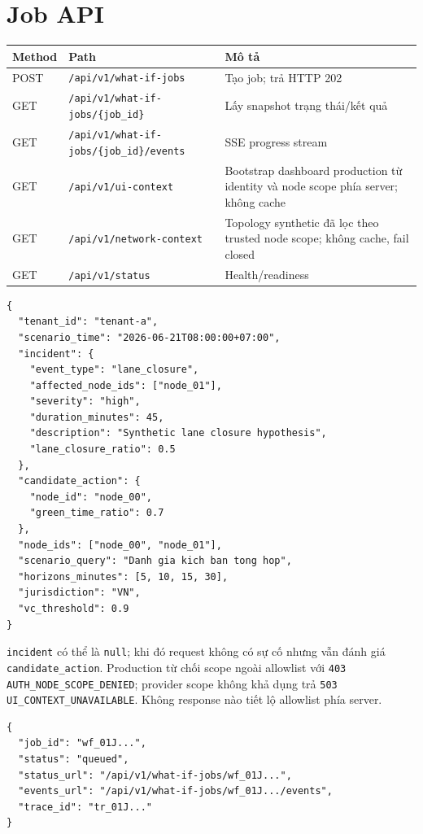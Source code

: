 \section{Job API}

\begin{longtable}{p{2cm} p{6cm} p{6cm}}
\toprule
\textbf{Method} & \textbf{Path} & \textbf{Mô tả} \\
\midrule
POST & \texttt{/api/v1/what-if-jobs} & Tạo job; trả HTTP 202 \\
GET & \texttt{/api/v1/what-if-jobs/}\newline\texttt{\{job\_id\}} & Lấy snapshot trạng thái/kết quả \\
GET & \texttt{/api/v1/what-if-jobs/}\newline\texttt{\{job\_id\}/events} & SSE progress stream \\
GET & \texttt{/api/v1/ui-context} & Bootstrap dashboard production từ identity và node scope phía server; không cache \\
GET & \texttt{/api/v1/network-context} & Topology synthetic đã lọc theo trusted node scope; không cache, fail closed \\
GET & \texttt{/api/v1/status} & Health/readiness \\
\bottomrule
\end{longtable}

\begin{lstlisting}[caption={Create-job request có incident tùy chọn},label={lst:api_create_request}]
{
  "tenant_id": "tenant-a",
  "scenario_time": "2026-06-21T08:00:00+07:00",
  "incident": {
    "event_type": "lane_closure",
    "affected_node_ids": ["node_01"],
    "severity": "high",
    "duration_minutes": 45,
    "description": "Synthetic lane closure hypothesis",
    "lane_closure_ratio": 0.5
  },
  "candidate_action": {
    "node_id": "node_00",
    "green_time_ratio": 0.7
  },
  "node_ids": ["node_00", "node_01"],
  "scenario_query": "Danh gia kich ban tong hop",
  "horizons_minutes": [5, 10, 15, 30],
  "jurisdiction": "VN",
  "vc_threshold": 0.9
}
\end{lstlisting}

\texttt{incident} có thể là \texttt{null}; khi đó request không có sự cố nhưng
vẫn đánh giá \texttt{candidate\_action}. Production từ chối scope ngoài
allowlist với \texttt{403} \nolinkurl{AUTH_NODE_SCOPE_DENIED}; provider scope không khả
dụng trả \texttt{503} \nolinkurl{UI_CONTEXT_UNAVAILABLE}. Không response nào tiết lộ
allowlist phía server.

\begin{lstlisting}[caption={Create-job response},label={lst:api_create}]
{
  "job_id": "wf_01J...",
  "status": "queued",
  "status_url": "/api/v1/what-if-jobs/wf_01J...",
  "events_url": "/api/v1/what-if-jobs/wf_01J.../events",
  "trace_id": "tr_01J..."
}
\end{lstlisting}

